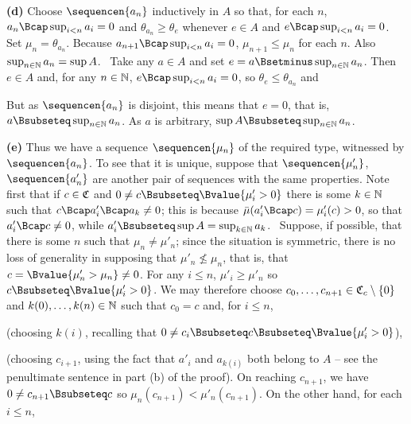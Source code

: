 {{\bf (d)} Choose $\sequencen{a_n}$ inductively in $A$ so that, for each
$n$, $a_n\Bcap\sup_{i<n}a_i=0$ and $\theta_{a_n}\ge \theta_e$ whenever
$e\in A$ and $e\Bcap\sup_{i<n}a_i=0$.   Set $\mu_n=\theta_{a_n}$.   Because
$a_{n+1}\Bcap\sup_{i<n}a_i=0$, $\mu_{n+1}\le\mu_n$ for each $n$.   Also
$\sup_{n\in\Bbb N}a_n=\sup A$.   \Prf\  Take any $a\in A$ and set
$e=a\Bsetminus\sup_{n\in\Bbb N}a_n$.   Then $e\in A$ and, for any
$n\in\Bbb N$, $e\Bcap\sup_{i<n}a_i=0$, so $\theta_e\le\theta_{a_n}$ and


\noindent   But as $\sequencen{a_n}$ is disjoint, this means that $e=0$,
that is, $a\Bsubseteq\sup_{n\in\Bbb N}a_n$.    As $a$ is arbitrary,
$\sup A\Bsubseteq\sup_{n\in\Bbb N}a_n$.\   \Qed

\medskip

{\bf (e)} Thus we have a sequence $\sequencen{\mu_n}$ of the required
type, witnessed by $\sequencen{a_n}$.   To see that it is unique,
suppose that $\sequencen{\mu'_n}$, $\sequencen{a'_n}$ are another pair
of sequences with the same properties.    Note first that if $c\in\frak
C$ and $0\ne c\Bsubseteq\Bvalue{\mu'_i>0}$ there is some $k\in\Bbb N$
such that $c\Bcap a'_i\Bcap a_k\ne 0$;  this is because
$\bar\mu(a'_i\Bcap c)=\mu'_i(c)>0$, so that $a'_i\Bcap c\ne 0$, while
$a'_i\Bsubseteq\sup A=\sup_{k\in\Bbb N}a_k$.    \Quer\  Suppose, if
possible, that there is some $n$ such that $\mu_n\ne\mu'_n$;  since the
situation is symmetric, there is no loss of generality in supposing that
$\mu'_n\not\le\mu_n$, that is, that $c=\Bvalue{\mu'_n>\mu_n}\ne 0$.
For any $i\le n$, $\mu'_i\ge\mu'_n$ so $c\Bsubseteq\Bvalue{\mu'_i>0}$.
We may therefore choose $c_0,\ldots, c_{n+1}\in\frak C_c\setminus\{0\}$
and $k(0),\ldots,k(n)\in\Bbb N$ such that $c_0=c$ and, for $i\le n$,


\noindent (choosing $k(i)$, recalling that $0\ne c_i\Bsubseteq
c\Bsubseteq\Bvalue{\mu'_i>0}$),


\noindent (choosing $c_{i+1}$, using the fact that $a'_i$ and $a_{k(i)}$
both belong to $A$ -- see the penultimate sentence in part (b) of the
proof).   On reaching $c_{n+1}$, we have $0\ne c_{n+1}\Bsubseteq c$ so
$\mu_n(c_{n+1})<\mu'_n(c_{n+1})$.   On the other hand, for each $i\le
n$,

}

